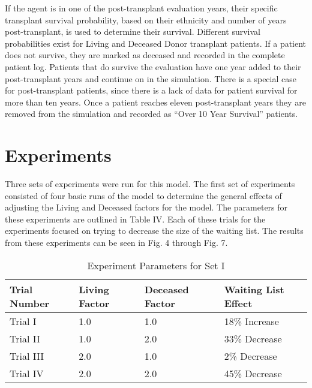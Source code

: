 \documentclass[9pt,a4paper,twocolumn]{scrartcl}
\begin{document}
If the agent is in one of the post-transplant evaluation years, their specific transplant survival probability, based on their ethnicity and number of years post-transplant, is used to determine their survival.  Different survival probabilities exist for Living and Deceased Donor transplant patients.  If a patient does not survive, they are marked as deceased and recorded in the complete patient log.  Patients that do survive the evaluation have one year added to their post-transplant years and continue on in the simulation.  
There is a special case for post-transplant patients, since there is a lack of data for patient survival for more than ten years.  Once a patient reaches eleven post-transplant years they are removed from the simulation and recorded as “Over 10 Year Survival” patients.  



\section{Experiments}

Three sets of experiments were run for this model.  The first set of experiments consisted of four basic runs of the model to determine the general effects of adjusting the Living and Deceased factors for the model.  The parameters for these experiments are outlined in Table IV.  Each of these trials for the experiments focused on trying to decrease the size of the waiting list.  The results from these experiments can be seen in Fig. 4 through Fig. 7.

\begin{table}[ht] 
\caption{Experiment Parameters for Set I} %
\centering %
\begin{tabular}{p{1.5cm} p{1cm} p{1cm} p{2cm}} %
\hline\hline %
Trial Number & Living Factor & Deceased Factor & Waiting List Effect \\ [0.5ex] %
\hline %
Trial I & 1.0 & 1.0 & 18\% Increase \\ %
Trial II & 1.0 & 2.0 & 33\% Decrease \\ 
Trial III & 2.0 & 1.0 & 2\% Decrease \\ 
Trial IV & 2.0 & 2.0 & 45\% Decrease \\ [1ex]
\hline %
\end{tabular} 
\label{table:nonlin} %
\end{table} 
\end{document}

